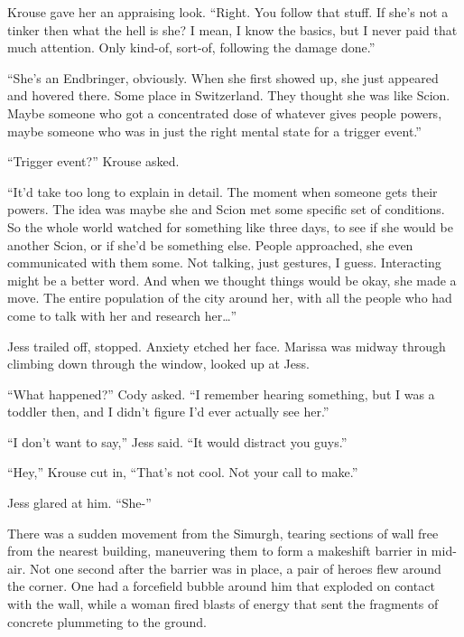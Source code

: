 Krouse gave her an appraising look. ``Right.  You follow that stuff.  If she's not a tinker then what the hell is she?  I mean, I know the basics, but I never paid that much attention.  Only kind-of, sort-of, following the damage done.''



``She's an Endbringer, obviously.  When she first showed up, she just appeared and hovered there.  Some place in Switzerland.  They thought she was like Scion.  Maybe someone who got a concentrated dose of whatever gives people powers, maybe someone who was in just the right mental state for a trigger event.''



``Trigger event?'' Krouse asked.



``It'd take too long to explain in detail.  The moment when someone gets their powers.  The idea was maybe she and Scion met some specific set of conditions.  So the whole world watched for something like three days, to see if she would be another Scion, or if she'd be something else.   People approached, she even communicated with them some.  Not talking, just gestures, I guess.  Interacting might be a better word.  And when we thought things would be okay, she made a move.  The entire population of the city around her, with all the people who had come to talk with her and research her\ldots''



Jess trailed off, stopped.  Anxiety etched her face.  Marissa was midway through climbing down through the window, looked up at Jess.



``What happened?''  Cody asked.  ``I remember hearing something, but I was a toddler then, and I didn't figure I'd ever actually see her.''



``I don't want to say,'' Jess said.  ``It would distract you guys.''



``Hey,'' Krouse cut in, ``That's not cool.  Not your call to make.''



Jess glared at him.  ``She-''



There was a sudden movement from the Simurgh, tearing sections of wall free from the nearest building, maneuvering them to form a makeshift barrier in mid-air.  Not one second after the barrier was in place, a pair of heroes flew around the corner.  One had a forcefield bubble around him that exploded on contact with the wall, while a woman fired blasts of energy that sent the fragments of concrete plummeting to the ground.



